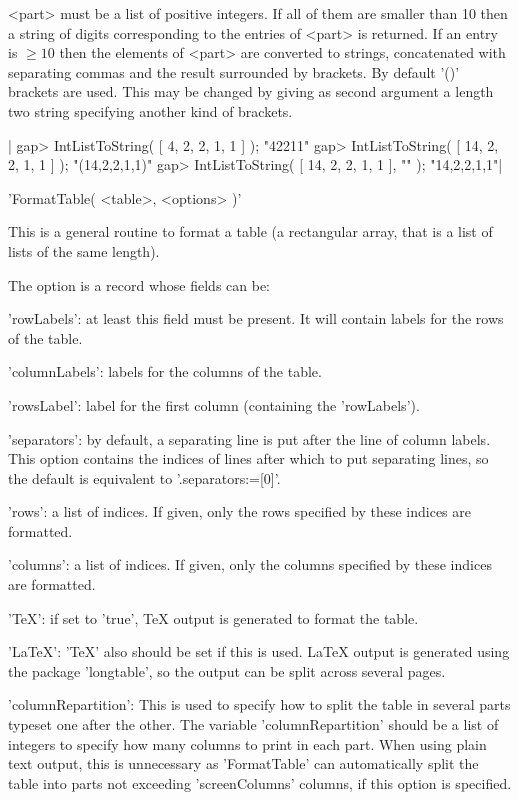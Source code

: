 <part>  must be a list  of positive integers. If all  of them are smaller
than 10 then a string of digits corresponding to the entries of <part> is
returned.  If  an entry is  $\ge 10$  then  the elements of  <part>  are
converted to strings, concatenated  with separating commas and the result
surrounded by brackets.  By default '()' brackets  are used.  This may be
changed  by giving  as  second argument a  length   two string specifying
another kind of brackets.

|    gap> IntListToString( [ 4, 2, 2, 1, 1 ] );
    "42211"
    gap> IntListToString( [ 14, 2, 2, 1, 1 ] );
    "(14,2,2,1,1)"
    gap> IntListToString( [ 14, 2, 2, 1, 1 ], "{}" );
    "{14,2,2,1,1}"|

%
%

'FormatTable( <table>, <options> )'

This is a general routine to format a table (a rectangular array, that is a
list of lists of the same length).

The option is a record whose fields can be:

'rowLabels':  at least this  field must be  present. It will contain labels
for the rows of the table.

'columnLabels': labels for the columns of the table.

'rowsLabel': label for the first column (containing the 'rowLabels').

'separators': by default, a separating line is put after the line of column
labels.  This  option  contains  the  indices  of  lines after which to put
separating lines, so the default is equivalent to '.separators:=[0]'.

'rows':  a list  of indices.  If given,  only the  rows specified  by these
indices are formatted.

'columns': a list of indices. If given, only the columns specified by these
indices are formatted.

'TeX': if set to 'true', TeX output is generated to format the table.

'LaTeX':  'TeX'  also  should  be  set  if  this  is  used. LaTeX output is
generated  using the package 'longtable', so the output can be split across
several pages.

'columnRepartition':  This is  used to  specify how  to split  the table in
several parts typeset one after the other. The variable 'columnRepartition'
should  be a list of integers to specify  how many columns to print in each
part.  When using plain  text output, this  is unnecessary as 'FormatTable'
can  automatically split the table into parts not exceeding 'screenColumns'
columns, if this option is specified.


